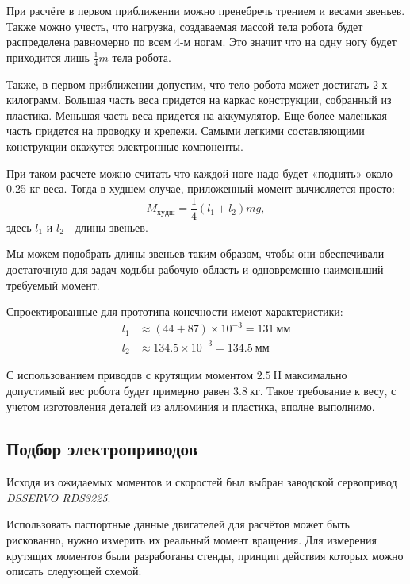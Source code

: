 При расчёте в первом приближении можно пренебречь трением и весами звеньев. Также можно учесть, что нагрузка, создаваемая массой тела робота будет распределена равномерно по всем 4-м ногам. Это значит что на одну ногу будет приходится лишь $\frac{1}{4}m$ тела робота.

Также, в первом приближении допустим, что тело робота может достигать 2-х килограмм. Большая часть веса придется на каркас конструкции, собранный из пластика. Меньшая часть веса придется на аккумулятор. Еще более маленькая часть придется на проводку и крепежи. Самыми легкими составляющими конструкции окажутся электронные компоненты.

При таком расчете можно считать что каждой ноге надо будет «поднять» около 0.25 кг веса. Тогда в худшем случае, приложенный момент вычисляется просто:
$$ M_{худш}= \frac 1 4 (l_{1}+l_{2}) m g, $$
\noindent здесь $l_1$ и $l_2$ - длины звеньев.

Мы можем подобрать длины звеньев таким образом, чтобы они обеспечивали достаточную для задач ходьбы рабочую область и одновременно наименьший требуемый момент.

Спроектированные для прототипа конечности имеют характеристики:
\begin{align*}
    l_1 &\approx (44 + 87) \times 10^{-3} = 131\: мм \\
    l_2 &\approx 134.5 \times 10^{-3} = 134.5\: мм
\end{align*}

\noindent С использованием приводов с крутящим моментом $ 2.5 \: Н $ максимально допустимый вес робота будет примерно равен $ 3.8 \: кг $. Такое требование к весу, с учетом изготовления деталей из аллюминия и пластика, вполне выполнимо.

\subsection{Подбор электроприводов}

Исходя из ожидаемых моментов и скоростей был выбран заводской сервопривод \textit{DSSERVO RDS3225}.

Использовать паспортные данные двигателей для расчётов может быть рискованно, нужно измерить их реальный момент вращения. Для измерения крутящих моментов были разработаны стенды, принцип действия которых можно описать следующей схемой:

